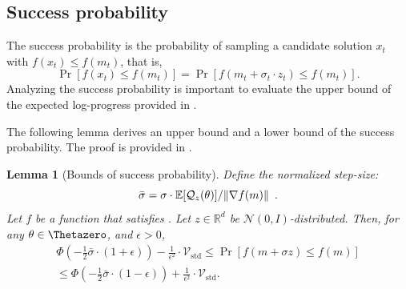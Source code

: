 \documentclass[journal]{IEEEtran}
\providecommand{\R}{\mathbb{R}} %
\providecommand{\E}{\mathbb{E}} %
\renewcommand{\geq}{\geqslant} %
\renewcommand{\leq}{\leqslant} %
\DeclarePairedDelimiter{\norm}{\lVert}{\rVert}
\newtheorem{lemma}[theorem]{Lemma}
\theoremstyle{definition}
\begin{document}

\subsection{Success probability}

The success probability is the probability of sampling a candidate solution $x_t$ with $f(x_t) \leq f(m_t)$, that is, 
\begin{equation}
\Pr[f(x_t) \leq f(m_t)] = \Pr[f(m_t + \sigma_t \cdot z_t) \leq f(m_t)].
\end{equation}
Analyzing the success probability is important to evaluate the upper bound of the expected log-progress provided in .

The following lemma derives an upper bound and a lower bound of the success probability.
The proof is provided in .
\begin{lemma}[Bounds of success probability]\label{lemma:successprobability}
Define the normalized step-size: 
\begin{equation}
\bar\sigma = \sigma\cdot\E[\mathcal{Q}_z(\theta)]/\norm{\nabla f(m)}
\enspace.
\end{equation}
Let $f$ be a function that satisfies .
Let $z \in \R^d$ be $\mathcal{N}(0, I)$-distributed.
Then, for any $\theta\in\Thetazero$, and $\epsilon > 0$,
\begin{multline}
\Phi\left( - \frac12 \bar\sigma\cdot(1+\epsilon)\right)
  - \frac{1}{\epsilon^2} \cdot \mathcal{V}_\mathrm{std}
\leq 
\Pr\left[f(m + \sigma z) \leq f(m) \right]
\\
\leq 
\Phi\left( - \frac12 \bar\sigma\cdot(1-\epsilon)\right)
  + \frac{1}{\epsilon^2} \cdot \mathcal{V}_\mathrm{std}
.
\label{eq:lemma:successprobability}
\end{multline}
\end{lemma}
\end{document}
